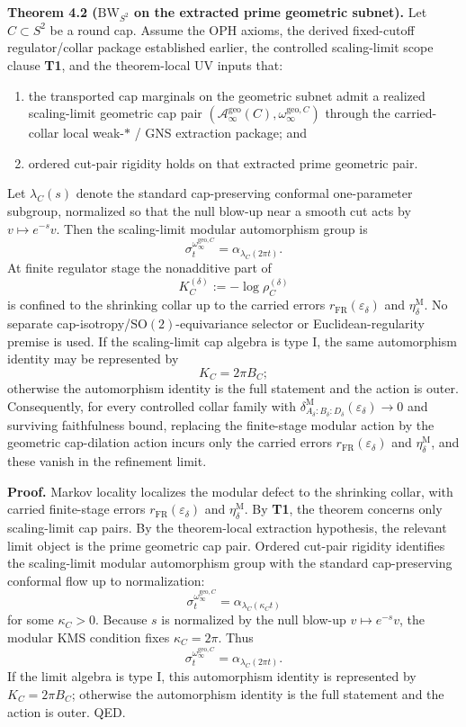 \textbf{Theorem 4.2 (\(\mathrm{BW}_{S^2}\) on the extracted prime geometric subnet).} Let \(C\subset S^2\) be a round cap. Assume the OPH axioms, the derived fixed-cutoff regulator/collar package established earlier, the controlled scaling-limit scope clause \textbf{T1}, and the theorem-local UV inputs that:
\begin{enumerate}
\item the transported cap marginals on the geometric subnet admit a realized scaling-limit geometric cap pair \((\mathcal A_\infty^{\mathrm{geo}}(C),\omega_\infty^{\mathrm{geo},C})\) through the carried-collar local weak-\(*\) / GNS extraction package; and
\item ordered cut-pair rigidity holds on that extracted prime geometric pair.
\end{enumerate}
Let \(\lambda_C(s)\) denote the standard cap-preserving conformal one-parameter subgroup, normalized so that the null blow-up near a smooth cut acts by \(v\mapsto e^{-s}v\). Then the scaling-limit modular automorphism group is
\[
\sigma_t^{\omega_\infty^{\mathrm{geo},C}}
=
\alpha_{\lambda_C(2\pi t)}.
\]
At finite regulator stage the nonadditive part of
\[
K_C^{(\delta)}:=-\log \rho_C^{(\delta)}
\]
is confined to the shrinking collar up to the carried errors \(r_{\mathrm{FR}}(\varepsilon_\delta)\) and \(\eta_\delta^{\mathrm M}\). No separate cap-isotropy/\(\mathrm{SO}(2)\)-equivariance selector or Euclidean-regularity premise is used. If the scaling-limit cap algebra is type I, the same automorphism identity may be represented by
\[
K_C=2\pi B_C;
\]
otherwise the automorphism identity is the full statement and the action is outer. Consequently, for every controlled collar family with \(\delta^{\mathrm M}_{A_\delta:B_\delta:D_\delta}(\varepsilon_\delta)\to0\) and surviving faithfulness bound, replacing the finite-stage modular action by the geometric cap-dilation action incurs only the carried errors \(r_{\mathrm{FR}}(\varepsilon_\delta)\) and \(\eta_\delta^{\mathrm M}\), and these vanish in the refinement limit.

\textbf{Proof.} Markov locality localizes the modular defect to the shrinking collar, with carried finite-stage errors \(r_{\mathrm{FR}}(\varepsilon_\delta)\) and \(\eta_\delta^{\mathrm M}\). By \textbf{T1}, the theorem concerns only scaling-limit cap pairs. By the theorem-local extraction hypothesis, the relevant limit object is the prime geometric cap pair. Ordered cut-pair rigidity identifies the scaling-limit modular automorphism group with the standard cap-preserving conformal flow up to normalization:
\[
\sigma_t^{\omega_\infty^{\mathrm{geo},C}}
=
\alpha_{\lambda_C(\kappa_C t)}
\]
for some \(\kappa_C>0\). Because \(s\) is normalized by the null blow-up \(v\mapsto e^{-s}v\), the modular KMS condition fixes \(\kappa_C=2\pi\). Thus
\[
\sigma_t^{\omega_\infty^{\mathrm{geo},C}}
=
\alpha_{\lambda_C(2\pi t)}.
\]
If the limit algebra is type I, this automorphism identity is represented by \(K_C=2\pi B_C\); otherwise the automorphism identity is the full statement and the action is outer. QED.


